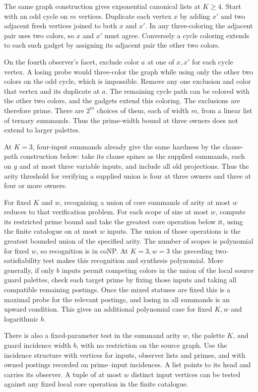 The same graph construction gives exponential
canonical lists at $K\ge4$. Start with an odd
cycle on $m$ vertices. Duplicate each vertex
$x$ by adding $x'$ and two adjacent fresh
vertices joined to both $x$ and $x'$. In any
three-coloring the adjacent pair uses two
colors, so $x$ and $x'$ must agree. Conversely
a cycle coloring extends to each such gadget
by assigning its adjacent pair the other two
colors.

On the fourth observer's facet, exclude
color $a$ at one of $x,x'$ for each cycle
vertex. A losing probe would three-color
the graph while using only the other two
colors on the odd cycle, which is impossible.
Remove any one exclusion and color that
vertex and its duplicate at $a$. The
remaining cycle path can be colored with
the other two colors, and the gadgets
extend this coloring. The exclusions are
therefore prime. There are $2^m$ choices
of them, each of width $m$, from a linear
list of ternary summands. Thus the
prime-width bound at three owners does
not extend to larger palettes.

At $K=3$, four-input summands already give the same
hardness by the clause-path construction below: take its
clause spines as the supplied summands, each on $y$ and at
most three variable inputs, and include all old projections.
Thus the arity threshold for verifying a supplied union is
four at three owners and three at four or more owners.

For fixed $K$ and $w$, recognizing a union of core summands
of arity at most $w$ reduces to that verification problem.
For each scope of size at most $w$, compute its restricted
prime bound and take the greatest core operation below it,
using the finite catalogue on at most $w$ inputs. The union
of those operations is the greatest bounded union of the
specified arity. The number of scopes is polynomial for
fixed $w$, so recognition is in coNP. At $K=3,w=3$ the
preceding two-satisfiability test makes this recognition and
synthesis polynomial. More generally, if only $b$ inputs
permit competing colors in the union of the local source
guard palettes, check each target prime by fixing those
inputs and taking all compatible remaining postings. Once
the mixed statuses are fixed this is a maximal probe for
the relevant postings, and losing in all summands is an
upward condition. This gives an additional polynomial
case for fixed $K,w$ and logarithmic $b$.

There is also a fixed-parameter test in the
summand arity $w$, the palette $K$, and guard
incidence width $b$, with no restriction on
the source graph. Use the incidence structure
with vertices for inputs, observer lists and
primes, and with owned postings recorded on
prime--input incidences. A list points to
its head and carries its observer. A tuple
of at most $w$ distinct input vertices can
be tested against any fixed local core
operation in the finite catalogue.

